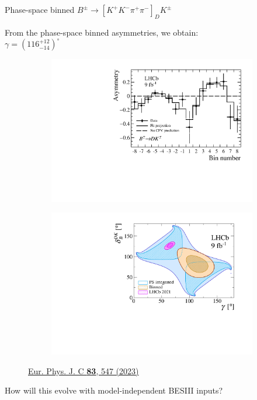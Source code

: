 \documentclass[xcolor={dvipsnames}]{beamer}
\begin{document}
\begin{frame}{Phase-space binned $B^\pm\to[K^+K^-\pi^+\pi^-]_DK^\pm$}
  \begin{center}
    \large From the phase-space binned asymmetries, we obtain:\\
    \vspace{0.2cm}
    $\gamma = (116^{+12}_{-14})^\circ$
  \end{center}
  \vspace{-0.2cm}
  \begin{figure}[htb]
    \centering
    \begin{subfigure}{0.5\textwidth}
      \includegraphics[width=1\textwidth]{Plots/BinAsymmetries_dk.pdf}
    \end{subfigure}%
    \begin{subfigure}{0.5\textwidth}
      \includegraphics[width=1\textwidth]{Plots/gammacharm_lhcb_KKpipi_GLW_KKpipi_GGSZ_lhcb_2020_beauty_and_charm_g_d_dk.pdf}
    \end{subfigure}
    \vspace{-0.5cm}
    \caption*{\tiny\href{https://link.springer.com/article/10.1140/epjc/s10052-023-11560-5}{Eur. Phys. J. C \textbf{83}, 547 (2023)}}
  \end{figure}
  \vspace{-0.5cm}
  \begin{center}
    {\large How will this evolve with model-independent BESIII inputs?}
  \end{center}
\end{frame}
\end{document}

